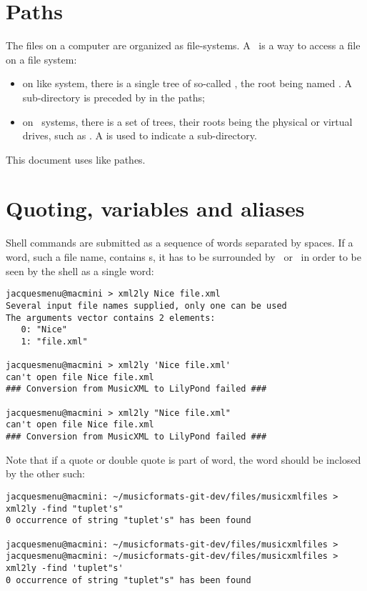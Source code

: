 \section{Paths}

The files on a computer are organized as file-systems. A \fspath\ is a way to access a file on a file system:
\begin{itemize}
\item on \Unix\-like system, there is a single tree of so-called , the root being named \code{/}. A sub-directory is preceded by \code{/} in the paths;
\item on \Windows\ systems, there is a set of trees, their roots being the physical or virtual drives, such as . A \code{\textbackslash} is used to indicate a sub-directory.
\end{itemize}

This document uses \Unix\-like pathes.


\section{Quoting, variables and aliases}\label{Quoting, variables and aliases}

Shell commands are submitted as a sequence of words separated by spaces. If a word, such a file name, contains s, it has to be surrounded by \quotes\ or \doubleQuotes\ in order to be seen by the shell as a single word:
\begin{lstlisting}[language=Terminal]
jacquesmenu@macmini > xml2ly Nice file.xml
Several input file names supplied, only one can be used
The arguments vector contains 2 elements:
   0: "Nice"
   1: "file.xml"

jacquesmenu@macmini > xml2ly 'Nice file.xml'
can't open file Nice file.xml
### Conversion from MusicXML to LilyPond failed ###

jacquesmenu@macmini > xml2ly "Nice file.xml"
can't open file Nice file.xml
### Conversion from MusicXML to LilyPond failed ###
\end{lstlisting}

Note that if a quote or double quote is part of word, the word should be inclosed by the other such:
\begin{lstlisting}[language=Terminal]
jacquesmenu@macmini: ~/musicformats-git-dev/files/musicxmlfiles > xml2ly -find "tuplet's"
0 occurrence of string "tuplet's" has been found

jacquesmenu@macmini: ~/musicformats-git-dev/files/musicxmlfiles > 
jacquesmenu@macmini: ~/musicformats-git-dev/files/musicxmlfiles > xml2ly -find 'tuplet"s'
0 occurrence of string "tuplet"s" has been found
\end{lstlisting}

